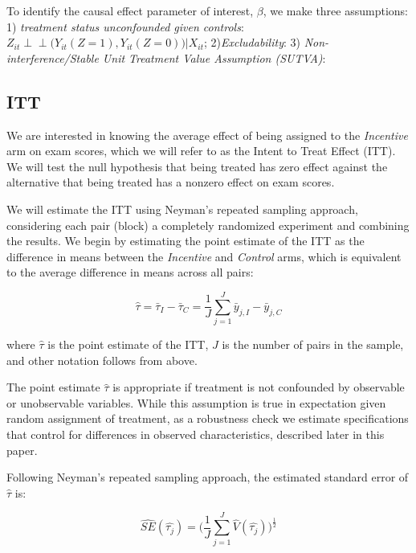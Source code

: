 \documentclass[12pt]{article}
\begin{document}
To identify the causal effect parameter of interest, $\beta$, we make three assumptions: 1) \textit{treatment status unconfounded given controls}: $Z_{it} \perp \!\!\! \perp \Big(Y_{it}(Z=1), Y_{it}(Z=0)\Big) \Big| X_{it}$; 2)\textit{Excludability}: 3) \textit{Non-interference/Stable Unit Treatment Value Assumption (SUTVA)}:



\subsection{ITT}

We are interested in knowing the average effect of being assigned to the \textit{Incentive} arm on exam scores, which we will refer to as the Intent to Treat Effect (ITT). We will test the null hypothesis that being treated has zero effect against the alternative that being treated has a nonzero effect on exam scores. %

We will estimate the ITT using Neyman's \citeyear{neyman1935} repeated sampling approach, considering each pair (block) a completely randomized experiment and combining the results. We begin by estimating the point estimate of the ITT as the difference in means between the \textit{Incentive} and \textit{Control} arms, which is equivalent to the average difference in means across all pairs:

\begin{equation} \label{itt_spec}
	\hat{\tau} = \bar{\tau}_I - \bar{\tau}_C = \frac{1}{J}\sum_{j=1}^{J} \bar{y}_{j,I} - \bar{y}_{j,C}
\end{equation}

where $\hat{\tau}$ is the point estimate of the ITT, $J$ is the number of pairs in the sample, and other notation follows from above.

The point estimate $\hat{\tau}$ is appropriate if treatment is not confounded by observable or unobservable variables. While this assumption is true in expectation given random assignment of treatment, as a robustness check we estimate specifications that control for differences in observed characteristics, described later in this paper.

Following Neyman's repeated sampling approach, the estimated standard error of $\hat{\tau}$ \citep{imai2008, ir2015, ai2017} is:

\begin{equation} \label{se_block}
	\hat{SE}(\hat{\tau_j}) = \Big(\frac{1}{J}\sum_{j=1}^{J} \hat{V}(\hat{\tau_j}) \Big)^\frac{1}{2}
\end{equation}
\end{document}
